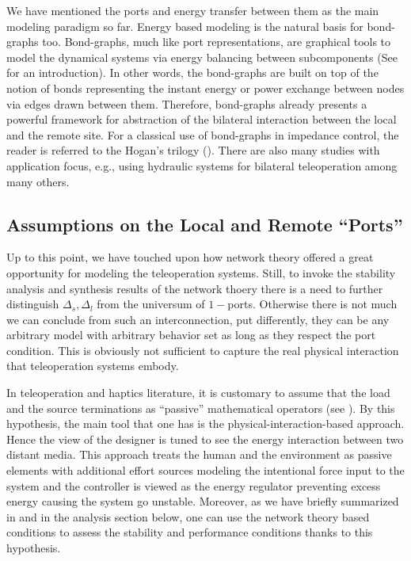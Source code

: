 We have mentioned the ports and energy transfer between them as the main modeling paradigm so far. Energy based modeling is 
the natural basis for bond-graphs too. Bond-graphs, much like port representations, are graphical tools to model the dynamical 
systems via energy balancing between subcomponents (See \cite{gawthrop} for an introduction). In other words, the bond-graphs are built on top of the notion 
of bonds representing the instant energy or power exchange between nodes via edges drawn between them. Therefore, bond-graphs
already presents a powerful framework for abstraction of the bilateral interaction between the local and the remote site. For a 
classical use of bond-graphs in impedance control, the reader is referred to the Hogan's trilogy (\cite{hogan:1,hogan:2,hogan:3}).
There are also many studies with application focus, e.g., \cite{krishnaswamy} using hydraulic systems for bilateral teleoperation
among many others. 



\subsection{Assumptions on the Local and Remote ``Ports''}

Up to this point, we have touched upon how network theory offered a great opportunity for modeling the 
teleoperation systems. Still, to invoke the stability analysis and synthesis results of the network thoery there is a need 
to further distinguish $\Delta_s,\Delta_l$ from the universum of $1-$ports. Otherwise there is not much we can conclude from such an 
interconnection, put differently, they can be any arbitrary model with arbitrary behavior set as long as they respect the port 
condition. This is obviously not sufficient to capture the real physical interaction that teleoperation systems embody. 

In teleoperation and haptics literature, it is customary to assume that the load and the source terminations as ``passive''
mathematical operators (see ). By this hypothesis, the main tool that one has is the physical-interaction-based approach. 
Hence the view of the designer is tuned to see the energy interaction between two distant media. This approach treats the human and the 
environment as passive elements with additional effort sources modeling the intentional force input to the system and the 
controller is viewed as the energy regulator preventing excess energy causing the system go unstable. Moreover, as we have
briefly summarized in  and in the analysis section below, one can use the network theory based conditions 
to assess the stability and performance conditions thanks to this hypothesis.

